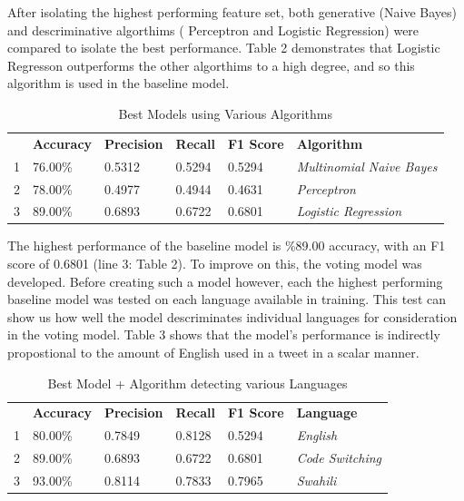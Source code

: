 \documentclass[12pt]{article}\usepackage[]{graphicx}\usepackage[]{color}
\begin{document}
After isolating the highest performing feature set, both generative (Naive Bayes) and descriminative algorthims ( Perceptron and Logistic Regression) were compared to isolate the best performance. Table 2 demonstrates that Logistic Regresson outperforms the other algorthims to a high degree, and so this algorithm is used in the baseline model.

\begin{table}[h]
\caption{Best Models using Various Algorithms}
\centering
\begin{tabular}{llllll}
\cline{2-6}
  & \textbf{Accuracy} & \textbf{Precision} & \textbf{Recall} & \textbf{F1 Score} & \textbf{Algorithm}               \\ \cline{2-6} 
1 & 76.00\%           & 0.5312             & 0.5294          & 0.5294            & \textit{Multinomial Naive Bayes} \\ \cline{2-6} 
2 & 78.00\%           & 0.4977             & 0.4944          & 0.4631            & \textit{Perceptron}              \\ \cline{2-6} 
3 & 89.00\%           & 0.6893             & 0.6722          & 0.6801            & \textit{Logistic Regression}     \\ \cline{2-6} 
\end{tabular}
\end{table}

The highest performance of the baseline model is \%89.00 accuracy, with an F1 score of 0.6801 (line 3: Table 2). To improve on this, the voting model was developed. Before creating such a model however, each the highest performing baseline model was tested on each language available in training. This test can show us how well the model descriminates individual languages for consideration in the voting model. Table 3 shows that the model's performance is indirectly propostional to the amount of English used in a tweet in a scalar manner.

\begin{table}[h]
\caption{Best Model + Algorithm detecting various Languages}
\centering
\begin{tabular}{llllll}
\cline{2-6}
  & \textbf{Accuracy} & \textbf{Precision} & \textbf{Recall} & \textbf{F1 Score} & \textbf{Language}       \\ \cline{2-6} 
1 & 80.00\%           & 0.7849             & 0.8128          & 0.5294            & \textit{English}        \\ \cline{2-6} 
2 & 89.00\%           & 0.6893             & 0.6722          & 0.6801            & \textit{Code Switching} \\ \cline{2-6} 
3 & 93.00\%           & 0.8114             & 0.7833          & 0.7965            & \textit{Swahili}        \\ \cline{2-6} 
\end{tabular}
\end{table}
\end{document}
